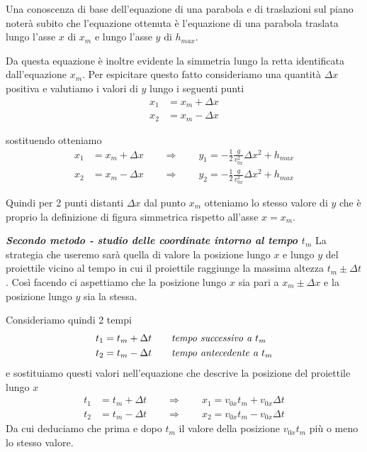 \documentclass{article}
\begin{document}
Una conoscenza di base dell'equazione di una parabola e di traslazioni sul piano noterà subito che l'equazione ottenuta è l'equazione di una parabola traslata lungo l'asse $x$ di $x_m$ e lungo l'asse $y$ di $h_{max}$.

Da questa equazione è inoltre evidente la simmetria lungo la retta identificata dall'equazione $x_m$. Per espicitare questo fatto consideriamo una quantità $\Delta x$ positiva e valutiamo i valori di $y$ lungo i seguenti punti
\begin{align}
  x_1 &= x_m + \Delta x \\
  x_2 &= x_m - \Delta x
\end{align}

sostituendo otteniamo
\begin{align}
  x_1 &= x_m + \Delta x \qquad \Rightarrow \qquad y_1 = -\frac{1}{2}\frac{g}{v_{0x}^2} \Delta x^2 + h_{max} \\
  x_2 &= x_m - \Delta x \qquad \Rightarrow \qquad y_2 = -\frac{1}{2}\frac{g}{v_{0x}^2} \Delta x^2 + h_{max}
\end{align}

Quindi per 2 punti distanti $\Delta x$ dal punto $x_m$ otteniamo lo stesso valore di $y$ che è proprio la definizione di figura simmetrica rispetto all'asse $x=x_m$.

\textbf{\textit{Secondo metodo - studio delle coordinate intorno al tempo $t_m$}}
\newline
La strategia che useremo sarà quella di valore la posizione lungo $x$ e lungo $y$ del proiettile vicino al tempo in cui il proiettile raggiunge la massima altezza $t_m \pm \Delta t$. Così facendo ci aspettiamo che la posizione lungo $x$ sia pari a $x_m \pm \Delta x$ e la posizione lungo $y$ sia la stessa.

Consideriamo quindi 2 tempi
\begin{align}
  t_1 &= t_m + \Delta t \qquad \text{\textit{tempo successivo a $t_m$}} \\
  t_2 &= t_m - \Delta t \qquad \text{\textit{tempo antecedente a $t_m$}}
\end{align}
e sostituiamo questi valori nell'equazione che descrive la posizione del proiettile lungo $x$
\begin{align}
  t_1 &= t_m + \Delta t \qquad \Rightarrow \qquad x_1 = v_{0x} t_m + v_{0x} \Delta t\\
  t_2 &= t_m - \Delta t \qquad \Rightarrow \qquad x_2 = v_{0x} t_m - v_{0x} \Delta t
\end{align}
Da cui deduciamo che prima e dopo $t_m$ il valore della posizione $v_{0x}t_m$ più o meno lo stesso valore.
\end{document}
